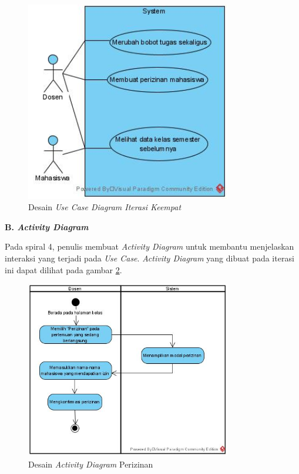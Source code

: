 \begin{figure}[h!]
	\centering
	\includegraphics[width=0.8\textwidth]{gambar/diagram/Use Case Iteration 4}
	\caption{Desain \textit{Use Case Diagram Iterasi Keempat}}
	\label{fig:usecase4th}
\end{figure}

\textbf{B. \textit{Activity Diagram}}

	Pada spiral 4, penulis membuat \textit{Activity Diagram} untuk membantu menjelaskan interaksi yang terjadi pada \textit{Use Case}. \textit{Activity Diagram} yang dibuat pada iterasi ini dapat dilihat pada gambar \ref{fig:actperizinan}.

\begin{figure}[h!]
	\centering
	\includegraphics[width=0.8\textwidth]{gambar/diagram/perizinan}
	\caption{Desain \textit{Activity Diagram} Perizinan}
	\label{fig:actperizinan}
\end{figure}


